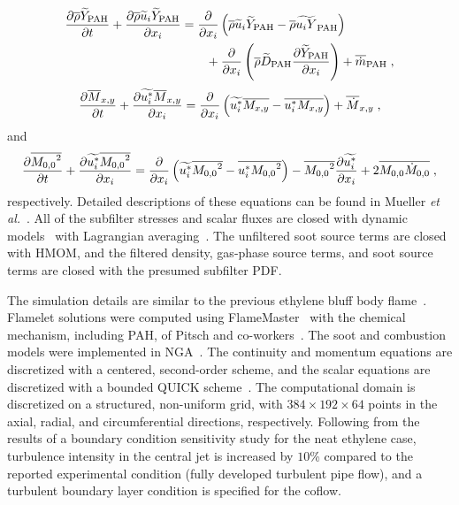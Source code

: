 \begin{equation}
  \begin{split}
    \frac{\partial \overline{\rho}\widetilde{Y}_{\rm PAH}}{\partial t} + \frac{\partial \overline{\rho}\widetilde{u}_i\widetilde{Y}_{\rm PAH}}{\partial x_i} &= 
    \frac{\partial }{\partial x_i}\left(\overline{\rho}\widetilde{u}_i\widetilde{Y}_{\rm PAH}-\overline{\rho}\widetilde{u_iY}_{\rm PAH}\right)\\
&\qquad + \frac{\partial }{\partial x_i}\left(\overline{\rho}\widetilde{D}_{\rm PAH}\frac{\partial \widetilde{Y}_{\rm PAH}}{\partial x_i}\right) +
    \overline{\dot{m}}_{\rm PAH}\;,
    \label{eq:LES-pah}
  \end{split}
\end{equation}
\begin{equation}
  \frac{\partial \overline{M}_{x,y}}{\partial t} +
  \frac{\partial \widetilde{u^\ast_i}\overline{M}_{x,y}}{\partial x_i} =
  \frac{\partial }{\partial x_i}\left(\widetilde{u^\ast_i}\overline{M_{x,y}}-\overline{u^\ast_iM_{x,y}}\right) +
  \overline{\dot{M}}_{x,y}\;,
  \label{eq:LES-Mfilter}
\end{equation}
and
\begin{equation}
  \frac{\partial \overline{{M_{0,0}}^2}}{\partial t} +
  \frac{\partial \widetilde{u^\ast_i}\overline{{M_{0,0}}^2}}{\partial x_i} = 
  \frac{\partial }{\partial x_i}\left(\widetilde{u^\ast_i}\overline{{M_{0,0}}^2}-\overline{u^\ast_i{M_{0,0}}^2}\right) -
  \overline{{M_{0,0}}^2}\frac{\partial \widetilde{u_i^\ast}}{\partial x_i} +
  2\overline{M_{0,0}\dot{M}_{0,0}}\;,
  \label{equ:M2filter}
\end{equation}
respectively.  Detailed descriptions of these equations can be found in Mueller \emph{et al.}~\cite{mueller12}.  All of the subfilter stresses and scalar fluxes are closed with dynamic models~\cite{germano91} with Lagrangian averaging~\cite{meneveau96}.  The unfiltered soot source terms are closed with HMOM, and the filtered density, gas-phase source terms, and soot source terms are closed with the presumed subfilter PDF.  

The simulation details are similar to the previous ethylene bluff body flame~\cite{mueller13}.  Flamelet solutions were computed using FlameMaster~\cite{flamemaster} with the chemical mechanism, including PAH, of Pitsch and co-workers~\cite{blanquart09b,narayanaswamy10}.  The soot and combustion models were implemented in NGA~\cite{desjardins08}.  The continuity and momentum equations are discretized with a centered, second-order scheme, and the scalar equations are discretized with a bounded QUICK scheme~\cite{herrmann06}.  The computational domain is discretized on a structured, non-uniform grid, with $384 \times 192 \times 64$ points in the axial, radial, and circumferential directions, respectively.  Following from the results of a boundary condition sensitivity study for the neat ethylene case, turbulence intensity in the central jet is increased by $10$\% compared to the reported experimental condition (fully developed turbulent pipe flow), and a turbulent boundary layer condition is specified for the coflow.  

